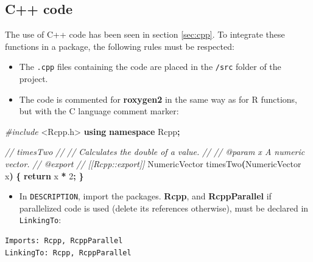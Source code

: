 \documentclass[
  12pt,
  american,
  a4paper,
  extrafontsizes,onecolumn,openright
  ]{memoir}
\newenvironment{Shaded}{\begin{snugshade}}{\end{snugshade}}
\newcommand{\CommentTok}[1]{\textcolor[rgb]{0.56,0.35,0.01}{\textit{#1}}}
\newcommand{\ControlFlowTok}[1]{\textcolor[rgb]{0.13,0.29,0.53}{\textbf{#1}}}
\newcommand{\DecValTok}[1]{\textcolor[rgb]{0.00,0.00,0.81}{#1}}
\newcommand{\ImportTok}[1]{#1}
\newcommand{\KeywordTok}[1]{\textcolor[rgb]{0.13,0.29,0.53}{\textbf{#1}}}
\newcommand{\NormalTok}[1]{#1}
\newcommand{\OperatorTok}[1]{\textcolor[rgb]{0.81,0.36,0.00}{\textbf{#1}}}
\newcommand{\PreprocessorTok}[1]{\textcolor[rgb]{0.56,0.35,0.01}{\textit{#1}}}
\providecommand{\tightlist}{%
  \setlength{\itemsep}{0pt}\setlength{\parskip}{0pt}}
\begin{document}
\hypertarget{c-code}{%
\subsection{C++ code}\label{c-code}}

The use of C++ code has been seen in section \ref{sec:cpp}.
To integrate these functions in a package, the following rules must be respected:

\begin{itemize}
\tightlist
\item
  The \texttt{.cpp} files containing the code are placed in the \texttt{/src} folder of the project.
\item
  The code is commented for \textbf{roxygen2} in the same way as for R functions, but with the C language comment marker:
\end{itemize}

\scriptsize

\begin{Shaded}
\begin{Highlighting}[]
\PreprocessorTok{\#include }\ImportTok{\textless{}Rcpp.h\textgreater{}}
\KeywordTok{using} \KeywordTok{namespace}\NormalTok{ Rcpp}\OperatorTok{;}

\CommentTok{//\textquotesingle{} timesTwo}
\CommentTok{//\textquotesingle{}}
\CommentTok{//\textquotesingle{} Calculates the double of a value.}
\CommentTok{//\textquotesingle{}}
\CommentTok{//\textquotesingle{} @param x A numeric vector.}
\CommentTok{//\textquotesingle{} @export}
\CommentTok{// [[Rcpp::export]]}
\NormalTok{NumericVector timesTwo}\OperatorTok{(}\NormalTok{NumericVector x}\OperatorTok{)} \OperatorTok{\{}
  \ControlFlowTok{return}\NormalTok{ x }\OperatorTok{*} \DecValTok{2}\OperatorTok{;}
\OperatorTok{\}}
\end{Highlighting}
\end{Shaded}

\normalsize

\begin{itemize}
\tightlist
\item
  In \texttt{DESCRIPTION}, import the packages.
  \textbf{Rcpp}, and \textbf{RcppParallel} if parallelized code is used (delete its references otherwise), must be declared in \texttt{LinkingTo}:
\end{itemize}

\begin{verbatim}
Imports: Rcpp, RcppParallel
LinkingTo: Rcpp, RcppParallel
\end{verbatim}
\end{document}
